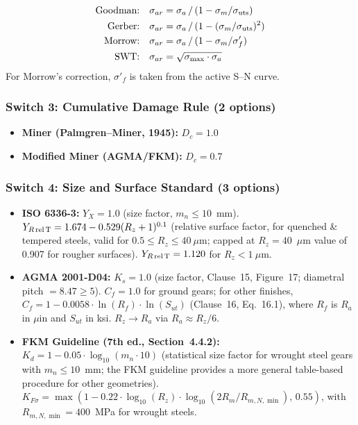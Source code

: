 \documentclass[12pt,a4paper]{article}
\begin{document}
\begin{subequations}\label{eq:mean_stress}
\begin{align}
\text{Goodman:}\quad
  \sigma_{ar} &= \sigma_a \,/\, (1 - \sigma_m/\sigma_{\rm uts})
  \label{eq:goodman} \\
\text{Gerber:}\quad
  \sigma_{ar} &= \sigma_a \,/\, (1 - (\sigma_m/\sigma_{\rm uts})^2)
  \label{eq:gerber} \\
\text{Morrow:}\quad
  \sigma_{ar} &= \sigma_a \,/\, (1 - \sigma_m/\sigma'_f)
  \label{eq:morrow} \\
\text{SWT:}\quad
  \sigma_{ar} &= \sqrt{\sigma_{\max} \cdot \sigma_a}
  \label{eq:swt}
\end{align}
\end{subequations}
For Morrow's correction, $\sigma'_f$ is taken from the active S--N
curve.

\subsubsection{Switch 3: Cumulative Damage Rule (2 options)}

\begin{itemize}
  \item \textbf{Miner (Palmgren--Miner, 1945):} $D_c = 1.0$
  \item \textbf{Modified Miner (AGMA/FKM):} $D_c = 0.7$
\end{itemize}

\subsubsection{Switch 4: Size and Surface Standard (3 options)}

\begin{itemize}
  \item \textbf{ISO 6336-3:} $Y_X = 1.0$ (size factor, $m_n \leq 10$~mm).
        $Y_{R\,\rm rel\,T} = 1.674 - 0.529(R_z+1)^{0.1}$ (relative
        surface factor, for quenched \& tempered steels, valid for
        $0.5 \leq R_z \leq 40~\mu$m; capped at $R_z=40$~$\mu$m value
        of 0.907 for rougher surfaces). $Y_{R\,\rm rel\,T} = 1.120$
        for $R_z < 1~\mu$m.
  \item \textbf{AGMA 2001-D04:} $K_s = 1.0$ (size factor, Clause~15,
        Figure~17; diametral pitch $=8.47 \geq 5$).
        $C_f = 1.0$ for ground gears; for other finishes,
        $C_f = 1 - 0.0058 \cdot \ln(R_f) \cdot \ln(S_{ut})$
        (Clause~16, Eq.~16.1), where $R_f$ is $R_a$ in $\mu$in
        and $S_{ut}$ in ksi. $R_z \rightarrow R_a$ via
        $R_a \approx R_z/6$.
  \item \textbf{FKM Guideline (7th ed., Section~4.4.2):}
        $K_d = 1 - 0.05 \cdot \log_{10}(m_n \cdot 10)$ (statistical size
        factor for wrought steel gears with $m_n \leq 10$~mm;
        the FKM guideline provides a more general table-based procedure
        for other geometries).
        $K_{F\sigma} = \max(1 - 0.22 \cdot \log_{10}(R_z) \cdot
        \log_{10}(2R_m/R_{m,N,\min}),\, 0.55)$, with
        $R_{m,N,\min}=400$~MPa for wrought steels.
\end{itemize}
\end{document}
